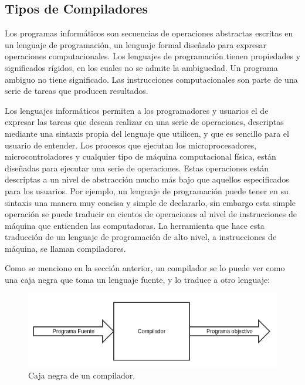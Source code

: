 \documentclass[fleqn]{tcdl}
\begin{document}
\subsection*{Tipos de Compiladores}

Los programas informáticos son secuencias de operaciones abstractas escritas en un lenguaje de programación, un lenguaje formal diseñado para expresar operaciones computacionales. Los lenguajes de programación tienen propiedades y significados rígidos, en los cuales no se admite la ambiguedad. Un programa ambiguo no tiene significado. Las instrucciones computacionales son parte de una serie de tareas que producen resultados. 

Los lenguajes informáticos permiten a los programadores y usuarios el de expresar las tareas que desean realizar en una serie de operaciones, descriptas mediante una sintaxis propia del lenguaje que utilicen, y que es sencillo para el usuario de entender. Los procesos que ejecutan los microprocesadores, microcontroladores y cualquier tipo de máquina computacional física, están diseñadas para ejecutar una serie de operaciones. Estas operaciones están descriptas a un nivel de abstracción mucho más bajo que aquellos especificados para los usuarios. Por ejemplo, un lenguaje de programación puede tener en su sintaxis una manera muy concisa y simple de declararlo, sin embargo esta simple operación se puede traducir en cientos de operaciones al nivel de instrucciones de máquina que entienden las computadoras. La herramienta que hace esta traducción de un lenguaje de programación de alto nivel, a instrucciones de máquina, se llaman compiladores. 

Como se menciono en la sección anterior, un compilador se lo puede ver como una caja negra que toma un lenguaje fuente, y lo traduce a otro lenguaje:


\begin{figure}
\captionsetup{type=figure}
\includegraphics[width=\textwidth]{compilador_basico.png}
\caption{\label{fig:comp_basic}Caja negra de un compilador.}
\end{figure}
\end{document}
